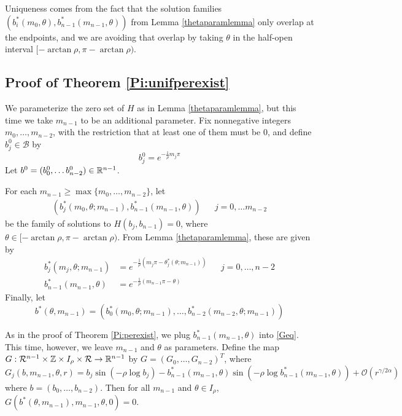 \documentclass[thesis.tex]{subfiles}
\begin{document}
Uniqueness comes from the fact that the solution families $(b_i^*(m_0, \theta), b_{n-1}^*(m_{n-1}, \theta))$ from Lemma \eqref{thetaparamlemma} only overlap at the endpoints, and we are avoiding that overlap by taking $\theta$ in the half-open interval $[-\arctan \rho, \pi - \arctan \rho)$. 

\subsection{Proof of Theorem \ref{Pi:unifperexist}}

We parameterize the zero set of $H$ as in Lemma \ref{thetaparamlemma}, but this time we take $m_{n-1}$ to be an additional parameter. Fix nonnegative integers $m_0, \dots, m_{n-2}$, with the restriction that at least one of them must be 0, and define $b_j^0 \in \mathcal{B}$ by
\[
b_j^0 = e^{-\frac{1}{\rho}m_j \pi}
\]
Let $b^0 = (b_0^0, \dots b_{n-2}^0) \in {\mathbb R}^{n-1}$.

For each $m_{n-1} \geq \max\{ m_0, \dots, m_{n-2} \}$, let
\begin{align}
(b_j^*(m_0, \theta; m_{n-1}), b_{n-1}^*(m_{n-1}, \theta)) && j = 0, \dots m_{n-2}
\end{align}
be the family of solutions to $H(b_j, b_{n-1}) = 0$, where $\theta \in [-\arctan \rho, \pi - \arctan \rho)$. From Lemma \ref{thetaparamlemma}, these are given by
\begin{equation}\label{bstarm}
\begin{aligned}
b_j^*(m_j, \theta; m_{n-1}) &= e^{-\frac{1}{\rho}(m_j \pi - \theta_j^*(\theta; m_{n-1}))} && j = 0, \dots, n-2 \\
b_{n-1}^*(m_{n-1}, \theta) &= e^{-\frac{1}{\rho}(m_{n-1}\pi - \theta)}
\end{aligned}
\end{equation}
Finally, let
\begin{equation}\label{defbstar}
b^*(\theta, m_{n-1}) = 
\left( b_0^*(m_0, \theta; m_{n-1}), \dots, b_{n-2}^*(m_{n-2}, \theta; m_{n-1}) \right)
\end{equation}

As in the proof of Theorem \ref{Pi:perexist}, we plug $b_{n-1}^*(m_{n-1}, \theta)$ into \eqref{Geq}. This time, however, we leave $m_{n-1}$ and $\theta$ as parameters. Define the map $G: \mathcal{R}^{n-1} \times {\mathbb Z} \times I_\rho \times \mathcal{R} \rightarrow {\mathbb R}^{n-1}$ by $G = (G_0, \dots, G_{n-2})^T$, where 
\begin{equation}\label{Gdef2}
G_j(b, m_{n-1}, \theta, r) = b_j \sin \left( -\rho \log b_j \right) - b_{n-1}^*(m_{n-1}, \theta) \sin \left( -\rho \log b_{n-1}^*(m_{n-1}, \theta) \right) + \mathcal{O}(r^{\gamma / 2 \alpha})
\end{equation}
where $b = (b_0, \dots, b_{n-2})$. Then for all $m_{n-1}$ and $\theta \in I_\rho$, $G(b^*(\theta, m_{n-1}), m_{n-1}, \theta, 0) = 0$.
\end{document}
